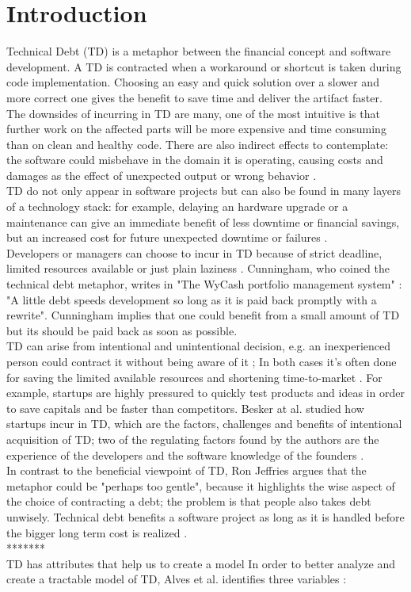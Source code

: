 \chapter{Introduction}
Technical Debt (TD) is a metaphor between the financial concept and software development.
A TD is contracted when a workaround or shortcut is taken during code implementation.
Choosing an easy and quick solution over a slower and more correct one gives the benefit to save time and deliver the artifact faster. 
\\
The downsides of incurring in TD are many, one of the most intuitive is that further work on the affected parts will be more expensive and time consuming than on clean and healthy code. There are also indirect effects to contemplate: the software could misbehave in the domain it is operating, causing costs and damages as the effect of unexpected output or wrong behavior \cite{tom2013exploration}.
\\
TD do not only appear in software projects but can also be found in many layers of a technology stack: for example, delaying an hardware upgrade or a maintenance can give an immediate benefit of less downtime or financial savings, but an increased cost for future unexpected downtime or failures \cite{allman2012managing}.
\\
Developers or managers can choose to incur in TD because of strict deadline, limited resources available or just plain laziness \cite{hinsen2015technical,allman2012managing}. Cunningham, who coined the technical debt metaphor, writes in "The WyCash portfolio management system" \cite{cunningham1992wycash}: "A little debt speeds development so long as it is paid back promptly with a rewrite". Cunningham implies that one could benefit from a small amount of TD but its should be paid back as soon as possible. 
\\
TD can arise from intentional and unintentional decision, e.g. an inexperienced person could contract it without being aware of it \cite{hinsen2015technical}; In both cases it's often done for saving the limited available resources and shortening time-to-market \cite{tom2012consolidated}. For example, startups are highly pressured to quickly test products and ideas in order to save capitals and be faster than competitors.
Besker at al. studied how startups incur in TD, which are the factors, challenges and benefits of intentional acquisition of TD; two of the regulating factors found by the authors are the experience of the developers and the software knowledge of the founders \cite{besker2018embracing}.
\\
In contrast to the beneficial viewpoint of TD, Ron Jeffries argues that the metaphor could be "perhaps too gentle", because it highlights the wise aspect of the choice of contracting a debt; the problem is that people also takes debt unwisely.
Technical debt benefits a software project as long as it is handled before the bigger long term cost is realized \cite{guo2016exploring}.
\\*******
\\
TD has attributes that help us to create a model 
In order to better analyze and create a tractable model of TD, Alves et al. identifies three variables \cite{martini2018technical}: 


